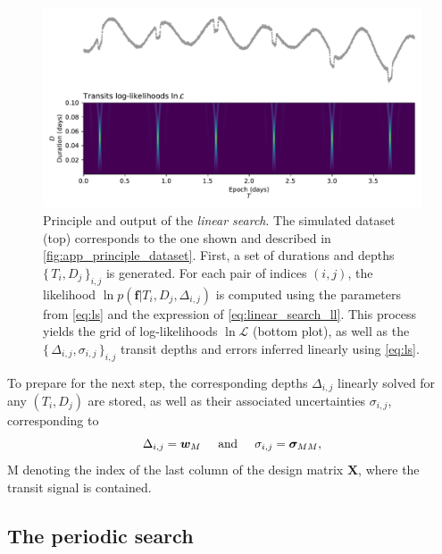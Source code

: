 \documentclass{aastex631}
\newcommand{\set}[1]{\{\,#1\,\}}
\begin{document}
\begin{figure}[H]
    \begin{centering}
        \includegraphics[width=0.8\linewidth]{principle_linear_search.pdf}
        \caption{Principle and output of the \textit{linear search}. The simulated dataset (top) corresponds to the one shown and described in \autoref{fig:app_principle_dataset}. First, a set of durations and depths $\set{T_i, D_j}_{i,j}$ is generated. For each pair of indices $(i,j)$, the likelihood $\ln p(\bm{f} \vert T_i ,D_j, \Delta_{i,j})$ is computed using the parameters from \autoref{eq:ls} and the expression of \autoref{eq:linear_search_ll}. This process yields the grid of log-likelihoods $\ln\mathcal{L}$ (bottom plot), as well as the $\set{\Delta_{i,j}, \sigma_{i,j}}_{i, j}$ transit depths and errors inferred linearly using \autoref{eq:ls}.}
        \label{fig:linear_search}
    \end{centering}
\end{figure}

\noindent To prepare for the next step, the corresponding depths $\Delta_{i,j}$ linearly solved for any $(T_i ,D_j)$ are stored, as well as their associated uncertainties $\sigma_{i,j}$, corresponding to
\begin{equation*}
    \Delta_{i,j} = \bm{w}_M \hspace{0.5cm}\text{and}\hspace{0.5cm} \sigma_{i,j} = \bm{\sigma}_{MM},
\end{equation*}
M denoting the index of the last column of the design matrix $\bm{X}$, where the transit signal is contained.

\subsection{The periodic search}
\end{document}
